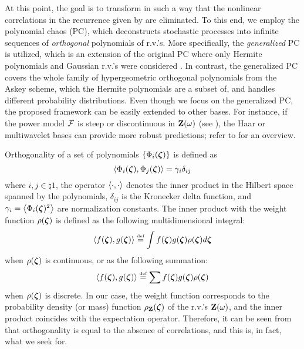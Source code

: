 At this point, the goal is to transform  in such a way that the nonlinear correlations in the recurrence given by  are eliminated. To this end, we employ the polynomial chaos (PC), which deconstructs stochastic processes into infinite sequences of \emph{orthogonal} polynomials of r.v.'s. More specifically, the \emph{generalized} PC \cite{xiu2002} is utilized, which is an extension of the original PC where only Hermite polynomials and Gaussian r.v.'s were considered \cite{ghanem1991}. In contrast, the generalized PC covers the whole family of hypergeometric orthogonal polynomials from the Askey scheme, which the Hermite polynomials are a subset of, and handles different probability distributions. Even though we focus on the generalized PC, the proposed framework can be easily extended to other bases. For instance, if the power model $\mathcal{F}$ is steep or discontinuous in $\mathbf{Z}(\omega)$ (see ), the Haar or multiwavelet bases can provide more robust predictions; refer to \cite{maitre2010} for an overview.

Orthogonality of a set of polynomials $\{ \Phi_i(\boldsymbol{\zeta}) \}$ is defined as
\begin{equation} \elabel{orthogonality}
  \oInner{\pcb_i(\vz)}{\pcb_j(\vz)} = \pcn_i \delta_{ij}
\end{equation}
where $i,j \in \natural{1}$, the operator $\oInner{\idot}{\idot}$ denotes the inner product in the Hilbert space spanned by the polynomials, $\delta_{ij}$ is the Kronecker delta function, and $\pcn_i = \oInner{\pcb_i(\vz)^2}$ are normalization constants. The inner product with the weight function $\rho(\boldsymbol{\zeta})$ is defined as the following multidimensional integral:
\begin{equation} \elabel{inner-product-integral}
  \oInner{f(\vz)}{g(\vz)} \eqdef \int f(\vz) g(\vz) \PDF(\vz) d\vz
\end{equation}
when $\rho(\boldsymbol{\zeta})$ is continuous, or as the following summation:
\begin{equation} \elabel{inner-product-sum}
  \oInner{f(\vz)}{g(\vz)} \eqdef \sum f(\vz) g(\vz) \PDF(\vz)
\end{equation}
when $\rho(\boldsymbol{\zeta})$ is discrete. In our case, the weight function corresponds to the probability density (or mass) function $\rho_{\mathbf{Z}}(\boldsymbol{\zeta})$ of the r.v.'s $\mathbf{Z}(\omega)$, and the inner product coincides with the expectation operator. Therefore, it can be seen from  that orthogonality is equal to the absence of correlations, and this is, in fact, what we seek for.

